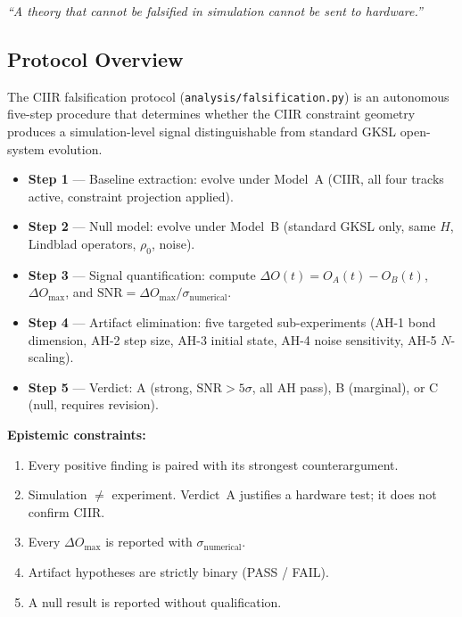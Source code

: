 \begin{center}
\textit{%
``A theory that cannot be falsified in simulation cannot be sent to hardware.''}
\end{center}

\subsection{Protocol Overview}

The CIIR falsification protocol (\texttt{analysis/falsification.py}) is an
autonomous five-step procedure that determines whether the CIIR constraint
geometry produces a simulation-level signal distinguishable from standard
GKSL open-system evolution.

\begin{itemize}
  \item \textbf{Step 1} — Baseline extraction: evolve under Model~A
    (CIIR, all four tracks active, constraint projection applied).
  \item \textbf{Step 2} — Null model: evolve under Model~B (standard
    GKSL only, same $H$, Lindblad operators, $\rho_0$, noise).
  \item \textbf{Step 3} — Signal quantification: compute
    $\Delta O(t) = O_A(t) - O_B(t)$, $\Delta O_{\max}$, and
    $\mathrm{SNR} = \Delta O_{\max}/\sigma_{\text{numerical}}$.
  \item \textbf{Step 4} — Artifact elimination: five targeted
    sub-experiments (AH-1 bond dimension, AH-2 step size,
    AH-3 initial state, AH-4 noise sensitivity, AH-5 $N$-scaling).
  \item \textbf{Step 5} — Verdict: A (strong, $\mathrm{SNR}>5\sigma$,
    all AH pass), B (marginal), or C (null, requires revision).
\end{itemize}

\textbf{Epistemic constraints:}
\begin{enumerate}
  \item[EC-1] Every positive finding is paired with its strongest
    counterargument.
  \item[EC-2] Simulation $\neq$ experiment.  Verdict~A justifies a
    hardware test; it does not confirm CIIR.
  \item[EC-3] Every $\Delta O_{\max}$ is reported with $\sigma_{\text{numerical}}$.
  \item[EC-4] Artifact hypotheses are strictly binary (PASS / FAIL).
  \item[EC-5] A null result is reported without qualification.
\end{enumerate}

